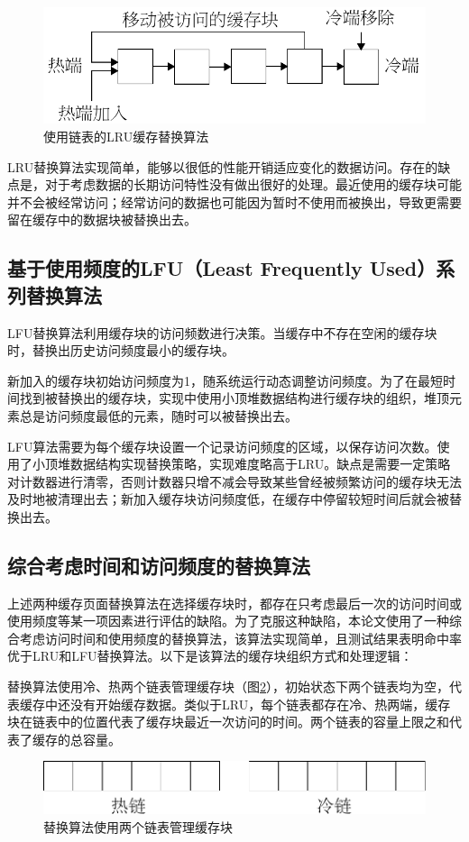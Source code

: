 \begin{figure}[!htb]
\centering
\includegraphics[width=0.6\linewidth]{./graph/replace-algo-lru}
\caption{使用链表的LRU缓存替换算法}
\label{fig:replace-algo-lru}
\end{figure}

LRU替换算法实现简单，能够以很低的性能开销适应变化的数据访问。存在的缺点是，对于考虑数据的长期访问特性没有做出很好的处理。最近使用的缓存块可能并不会被经常访问；经常访问的数据也可能因为暂时不使用而被换出，导致更需要留在缓存中的数据块被替换出去。

\subsection{基于使用频度的LFU（Least Frequently Used）系列替换算法}

LFU替换算法\cite{LFU}利用缓存块的访问频数进行决策。当缓存中不存在空闲的缓存块时，替换出历史访问频度最小的缓存块。

新加入的缓存块初始访问频度为1，随系统运行动态调整访问频度。为了在最短时间找到被替换出的缓存块，实现中使用小顶堆数据结构进行缓存块的组织，堆顶元素总是访问频度最低的元素，随时可以被替换出去。

LFU算法需要为每个缓存块设置一个记录访问频度的区域，以保存访问次数。使用了小顶堆数据结构实现替换策略，实现难度略高于LRU。缺点是需要一定策略对计数器进行清零，否则计数器只增不减会导致某些曾经被频繁访问的缓存块无法及时地被清理出去；新加入缓存块访问频度低，在缓存中停留较短时间后就会被替换出去。

\subsection{综合考虑时间和访问频度的替换算法}

上述两种缓存页面替换算法在选择缓存块时，都存在只考虑最后一次的访问时间或使用频度等某一项因素进行评估的缺陷。为了克服这种缺陷，本论文使用了一种综合考虑访问时间和使用频度的替换算法，该算法实现简单，且测试结果表明命中率优于LRU和LFU替换算法。以下是该算法的缓存块组织方式和处理逻辑：

替换算法使用冷、热两个链表管理缓存块（图\ref{fig:replace-algo-1}），初始状态下两个链表均为空，代表缓存中还没有开始缓存数据。类似于LRU，每个链表都存在冷、热两端，缓存块在链表中的位置代表了缓存块最近一次访问的时间。两个链表的容量上限之和代表了缓存的总容量。
\begin{figure}[!htb]
\centering
\includegraphics[width=0.6\linewidth]{./graph/replace-algo-1}
\caption{替换算法使用两个链表管理缓存块}
\label{fig:replace-algo-1}
\end{figure}

